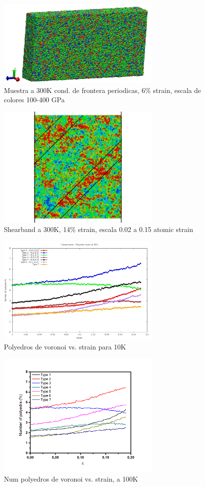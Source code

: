 \documentclass[10pt, oneside]{article} %
\begin{document}
\begin{figure}[H]
\centering
\includegraphics[width=8cm]{Figures/All_300K_6pstrain_sacale100-400_Comp.png}
\caption{Muestra a 300K cond. de frontera periodicas, 6\% strain, escala de colores 100-400 GPa}
\end{figure}

\begin{figure}[H]
\centering
\includegraphics[width=8cm]{Figures/ShearBand.png}
\caption{Shearband a 300K, 14\% strain, escala 0.02 a 0.15 atomic strain}
\end{figure}

\begin{figure}[H]
\centering
\includegraphics[width=8cm]{Figures/Compr_Polyedra_10K.jpeg}
\caption{Polyedros de voronoi vs. strain para 10K}
\end{figure}

\begin{figure}[H]
\centering
\includegraphics[width=8cm]{Figures/Polyedra_Vs_Strain_100K_COMP.png}
\caption{Num polyedros de voronoi vs. strain, a 100K}
\end{figure}
\end{document}
